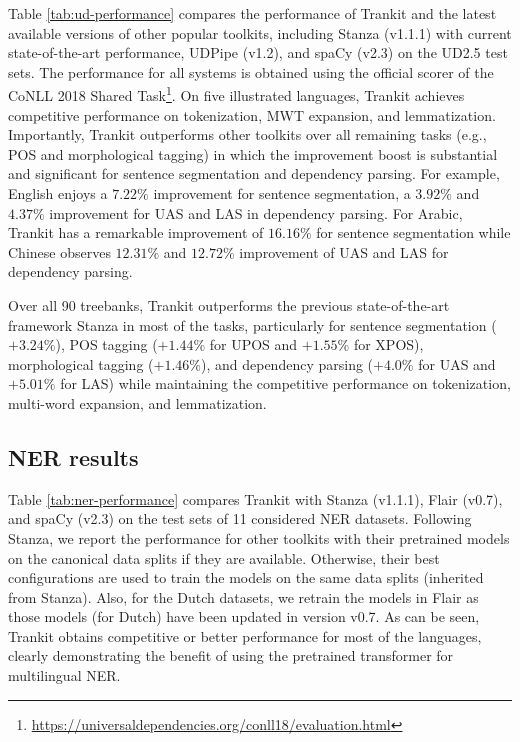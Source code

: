 \documentclass[11pt,a4paper]{article}
\begin{document}
Table \ref{tab:ud-performance} compares the performance of Trankit and the latest available versions of other popular toolkits, including Stanza (v1.1.1) with current state-of-the-art performance, UDPipe (v1.2), and spaCy (v2.3) on the UD2.5 test sets.  The performance for all systems is obtained using the official scorer of the CoNLL 2018 Shared Task\footnote{\url{https://universaldependencies.org/conll18/evaluation.html}}. On five illustrated languages, Trankit achieves competitive performance on tokenization, MWT expansion, and lemmatization. Importantly, Trankit outperforms other toolkits over all remaining tasks (e.g., POS and morphological tagging) in which the improvement boost is substantial and significant for sentence segmentation and dependency parsing. For example, English enjoys a $7.22\%$ improvement for sentence segmentation, a $3.92\%$ and $4.37\%$ improvement for UAS and LAS in dependency parsing. For Arabic, Trankit has a remarkable improvement of $16.16\%$ for sentence segmentation while Chinese observes $12.31\%$ and $12.72\%$ improvement of UAS and LAS for dependency parsing.





Over all 90 treebanks, Trankit outperforms the previous state-of-the-art framework Stanza in most of the tasks, particularly for sentence segmentation ($+3.24\%$), POS tagging ($+1.44\%$ for UPOS and $+1.55\%$ for XPOS), morphological tagging ($+1.46\%$), and dependency parsing ($+4.0\%$ for UAS and $+5.01\%$ for LAS) while maintaining the competitive performance on tokenization, multi-word expansion, and lemmatization.










\subsection{NER results}

Table \ref{tab:ner-performance} compares Trankit with Stanza (v1.1.1), Flair (v0.7), and spaCy (v2.3) on the test sets of 11 considered NER datasets. Following Stanza, we report the performance for other toolkits with their pretrained models on the canonical data splits if they are available. Otherwise, their best configurations are used to train the models on the same data splits (inherited from Stanza). Also, for the Dutch datasets, we retrain the models in Flair as those models (for Dutch) have been updated in version v0.7. As can be seen, Trankit obtains competitive or better performance for most of the languages, clearly demonstrating the benefit of using the pretrained transformer for multilingual NER.
\end{document}
